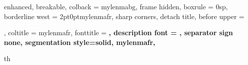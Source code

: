 
{%
	enhanced,
	breakable,
	colback = mylenmabg,
	frame hidden,
	boxrule = 0sp,
	borderline west = {2pt}{0pt}{mylenmafr},
	sharp corners,
	detach title,
	before upper = \tcbtitle\par\smallskip,
	coltitle = mylenmafr,
	fonttitle = \bfseries\sffamily,
	description font = \mdseries,
	separator sign none,
	segmentation style={solid, mylenmafr},
}
{th}


\newcommand{\thm}[2]{\begin{Theorem*}{#1}{}#2\end{Theorem*}}
\newcommand{\qs}[2]{\begin{question*}{#1}{}#2\end{question*}}
\newcommand{\prp}[2]{\begin{Property*}{#1}{}#2\end{Property*}}
\newcommand{\lemma}[2]{\begin{Lemma*}{#1}{}#2\end{Lemma*}}



\hfuzz=125pt      %

\usetikzlibrary{arrows.meta, calc, decorations.markings, backgrounds}
\usepackage{tikz-3dplot}
\usepackage{float}
\usepackage{esint}

